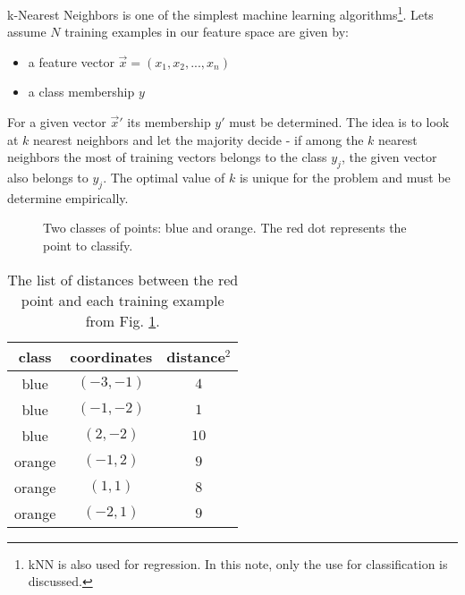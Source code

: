 k-Nearest Neighbors is one of the simplest machine learning algorithms\footnote{kNN is also used for regression. In this note, only the use for classification is discussed.}. Lets assume $N$ training examples in our feature space are given by:

\begin{itemize}
  \item a feature vector $\vec x = (x_1, x_2, ... , x_n)$
  \item a class membership $y$
\end{itemize}

For a given vector $\vec x'$ its membership $y'$ must be determined. The idea is to look at $k$ nearest neighbors and let the majority decide - if among the $k$ nearest neighbors the most of training vectors belongs to the class $y_j$, the given vector also belongs to $y_j$. The optimal value of $k$ is unique for the problem and must be determine empirically. 

\begin{figure}

  \centering
  \caption{Two classes of points: blue and orange. The red dot represents the point to classify.}
  \label{fig: knnExample}
  
\end{figure}

\begin{table}
\begin{center}
\begin{tabular}{c | c | c}

class & coordinates & distance$^2$ \\ \hline
\color{blue}blue     & $(-3,-1)$ & $4$  \\
\color{blue}blue     & $(-1,-2)$ & $1$  \\
\color{blue}blue     & $(2,-2)$  & $10$ \\ \hline
\color{orange}orange & $(-1,2)$  & $9$  \\
\color{orange}orange & $(1,1)$   & $8$  \\
\color{orange}orange & $(-2,1)$  & $9$  \\

\end{tabular}
\end{center}

\caption{The list of distances between the red point and each training example from Fig. \ref{fig: knnExample}.}
\label{tab: knnExDist}

\end{table}

